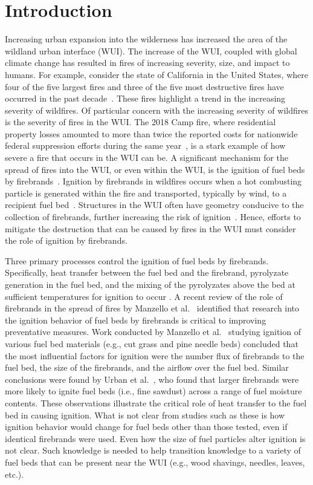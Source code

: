 \section{Introduction}
     Increasing urban expansion into the wilderness has increased the area of the wildland urban interface (WUI). The increase of the WUI, coupled with global climate change has resulted in fires of increasing severity, size, and impact to humans. For example, consider the state of California in the United States, where four of the five largest fires and three of the five most destructive fires have occurred in the past decade~\cite{CalFire2019, CALFIRE2018}. These fires highlight a trend in the increasing severity of wildfires. Of particular concern with the increasing severity of wildfires is the severity of fires in the WUI. The 2018 Camp fire, where residential property losses amounted to more than twice the reported costs for nationwide federal suppression efforts during the same year~\cite{USDOI/USDA2019, Insurance2019}, is a stark example of how severe a fire that occurs in the WUI can be. A significant mechanism for the spread of fires into the WUI, or even within the WUI, is the ignition of fuel beds by firebrands~\cite{Mell2010, Maranghides2013}. Ignition by firebrands in wildfires occurs when a hot combusting particle is generated within the fire and transported, typically by wind, to a recipient fuel bed~\cite{Koo2010a}. Structures in the WUI often have geometry conducive to the collection of firebrands, further increasing the risk of ignition~\cite{Suzuki2020}. Hence, efforts to mitigate the destruction that can be caused by fires in the WUI must consider the role of ignition by firebrands.
     
    Three primary processes control the ignition of fuel beds by firebrands. Specifically, heat transfer between the fuel bed and the firebrand, pyrolyzate generation in the fuel bed, and the mixing of the pyrolyzates above the bed at sufficient temperatures for ignition to occur \cite{Babrauskas2003}. A recent review of the role of firebrands in the spread of fires by Manzello et al.~\cite{Manzello2020} identified that research into the ignition behavior of fuel beds by firebrands is critical to improving preventative measures. Work conducted by Manzello et al.~\cite{Manzello2006a, Manzello2006, Manzello2008} studying ignition of various fuel bed materials (e.g., cut grass and pine needle beds) concluded that the most influential factors for ignition were the number flux of firebrands to the fuel bed, the size of the firebrands, and the airflow over the fuel bed. Similar conclusions were found by Urban et al.~\cite{Urban2019a}, who found that larger firebrands were more likely to ignite fuel beds (i.e., fine sawdust) across a range of fuel moisture contents. These observations illustrate the critical role of heat transfer to the fuel bed in causing ignition. What is not clear from studies such as these is how ignition behavior would change for fuel beds other than those tested, even if identical firebrands were used. Even how the size of fuel particles alter ignition is not clear. Such knowledge is needed to help transition knowledge to a variety of fuel beds that can be present near the WUI (e.g., wood shavings, needles, leaves, etc.). 
    
